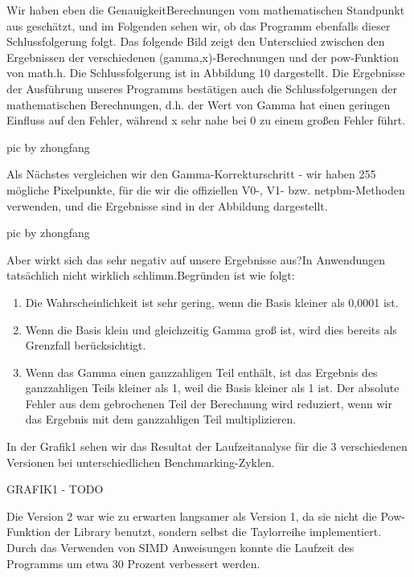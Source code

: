 \documentclass[course=erap]{aspdoc}
\begin{document}
\par
Wir haben eben die GenauigkeitBerechnungen vom mathematischen Standpunkt aus geschätzt, und im Folgenden sehen wir, ob das Programm ebenfalls dieser Schlussfolgerung folgt. Das folgende Bild zeigt den Unterschied zwischen den Ergebnissen der verschiedenen (gamma,x)-Berechnungen und der pow-Funktion von math.h. Die Schlussfolgerung ist in Abbildung 10 dargestellt. Die Ergebnisse der Ausführung unseres Programms bestätigen auch die Schlussfolgerungen der mathematischen Berechnungen, d.h. der Wert von Gamma hat einen geringen Einfluss auf den Fehler, während x sehr nahe bei 0 zu einem großen Fehler führt.

\par
pic by zhongfang

\par
Als Nächstes vergleichen wir den Gamma-Korrekturschritt - wir haben 255 mögliche Pixelpunkte, für die wir die offiziellen V0-, V1- bzw. netpbm-Methoden verwenden, und die Ergebnisse sind in der Abbildung dargestellt.

\par
pic by zhongfang

\par
Aber wirkt sich das sehr negativ auf unsere Ergebnisse aus?In Anwendungen tatsächlich nicht wirklich schlimm.Begründen ist wie folgt:
\begin{enumerate}
\item Die Wahrscheinlichkeit ist sehr gering, wenn die Basis kleiner als 0,0001 ist.
\item Wenn die Basis klein und gleichzeitig Gamma groß ist, wird dies bereits als Grenzfall berücksichtigt.
\item Wenn das Gamma einen ganzzahligen Teil enthält, ist das Ergebnis des ganzzahligen Teils kleiner als 1, weil die Basis kleiner als 1 ist. Der absolute Fehler aus dem gebrochenen Teil der Berechnung wird reduziert, wenn wir das Ergebnis mit dem ganzzahligen Teil multiplizieren.
\end{enumerate}

\par
In der Grafik1 sehen wir das Resultat der Laufzeitanalyse für die 3 verschiedenen Versionen bei unterschiedlichen Benchmarking-Zyklen.

\par
GRAFIK1 - TODO

\par
Die Version 2 war wie zu erwarten langsamer als Version 1, da sie nicht die Pow-Funktion der Library benutzt, sondern selbst die Taylorreihe implementiert. Durch das Verwenden von SIMD Anweisungen konnte die Laufzeit des Programms um etwa 30 Prozent verbessert werden.
\end{document}
